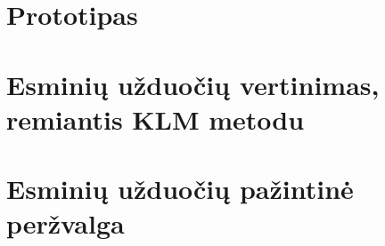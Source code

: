   

  \section{Prototipas}
  

  \newpage
  \section{Esminių užduočių vertinimas, remiantis KLM metodu}
  

  \newpage
  \section{Esminių užduočių pažintinė peržvalga}
  
